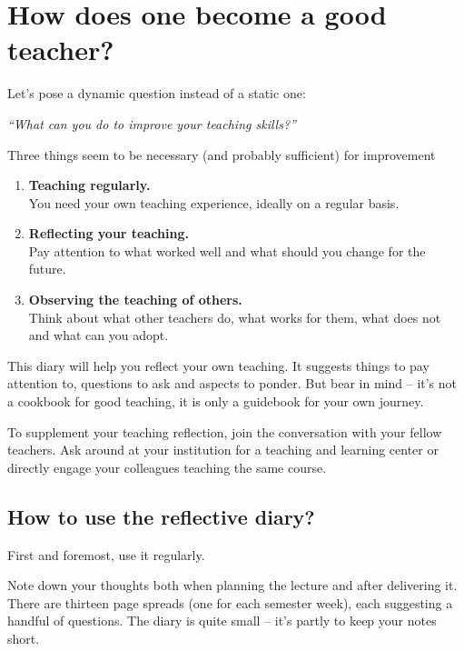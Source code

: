 
\chapter*{How does one become a good teacher?}

\vspace*{1em}
Let's pose a dynamic question instead of a static one:

\vspace*{1em}
\textit{\large \enquote{What can you do to improve your teaching skills?}}

\vspace*{1em}
Three things seem to be necessary (and probably sufficient) for improvement\footnotemark
{}
\begin{enumerate}
\item \textbf{Teaching regularly.}\\You need your own teaching experience, ideally on a regular basis.
\item \textbf{Reflecting your teaching.}\\Pay attention to what worked well and what should you change for the future.
\item \textbf{Observing the teaching of others.}\\Think about what other teachers do, what works for them, what does not and what can you adopt.
\end{enumerate}

This diary will help you reflect your own teaching. It suggests things to pay attention to, questions to ask and aspects to ponder. But bear in mind -- it's not a cookbook for good teaching, it is only a guidebook for your own journey.

To supplement your teaching reflection, join the conversation with your fellow teachers. Ask around at your institution for a teaching and learning center or directly engage your colleagues teaching the same course.

\newpage
\section*{How to use the reflective diary?}

First and foremost, use it regularly.

Note down your thoughts both when planning the lecture and after delivering it. There are thirteen page spreads (one for each semester week), each suggesting a handful of questions. The diary is quite small -- it's partly to keep your notes short.

